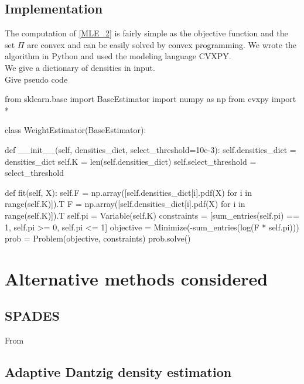 \subsection{Implementation}
The computation of \cref{MLE_2} is fairly simple as the objective function and the set $\Pi$ are convex and can be easily solved by convex programming. We wrote the algorithm in Python and used the modeling language CVXPY\cite{cvxpy}.\\
We give a dictionary of densities in input.\\
Give pseudo code
\begin{python}
from sklearn.base import BaseEstimator
import numpy as np
from cvxpy import *


class WeightEstimator(BaseEstimator):

    def __init__(self, densities_dict, select_threshold=10e-3):
        self.densities_dict  = densities_dict
        self.K = len(self.densities_dict)
        self.select_threshold = select_threshold

    def fit(self, X):
        self.F = np.array([self.densities_dict[i].pdf(X) for i in range(self.K)]).T
        F = np.array([self.densities_dict[i].pdf(X) for i in range(self.K)]).T
        self.pi = Variable(self.K)
        constraints = [sum_entries(self.pi) == 1, self.pi >= 0, self.pi <= 1]
        objective = Minimize(-sum_entries(log(F * self.pi)))
        prob = Problem(objective, constraints)
        prob.solve()
\end{python}

\section{Alternative methods considered}
\subsection{SPADES}
From \cite{SPADES}
\subsection{Adaptive Dantzig density estimation}

